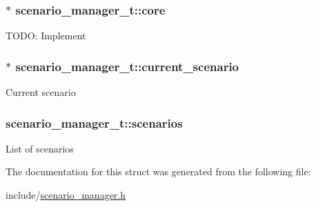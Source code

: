 \subsubsection[{\texorpdfstring{core}{core}}]{$\ast$ scenario\+\_\+manager\+\_\+t\+::core}\hypertarget{structscenario__manager__t_a4fff49d96cbc989dad6aea0594165a5d}{}\label{structscenario__manager__t_a4fff49d96cbc989dad6aea0594165a5d}
T\+O\+DO\+: Implement 
\subsubsection[{\texorpdfstring{current\+\_\+scenario}{current\_scenario}}]{$\ast$ scenario\+\_\+manager\+\_\+t\+::current\+\_\+scenario}\hypertarget{structscenario__manager__t_aa74df73bef016afb248a2c2df004bc8e}{}\label{structscenario__manager__t_aa74df73bef016afb248a2c2df004bc8e}
Current scenario 
\subsubsection[{\texorpdfstring{scenarios}{scenarios}}]{ scenario\+\_\+manager\+\_\+t\+::scenarios}\hypertarget{structscenario__manager__t_a3143c7412ad621c612faf9549b2826ad}{}\label{structscenario__manager__t_a3143c7412ad621c612faf9549b2826ad}
List of scenarios 

The documentation for this struct was generated from the following file\+:\begin{DoxyCompactItemize}
\item 
include/\hyperlink{scenario__manager_8h}{scenario\+\_\+manager.\+h}\end{DoxyCompactItemize}
